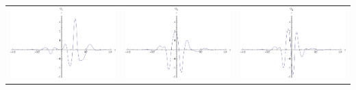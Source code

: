 \documentclass{article}
\begin{document}
\begin{landscape}
\begin{tabular}{ccc}
\includegraphics[width=6.7cm]{quadratic_wavelet_4.pdf}& \includegraphics[width=6.7cm]{quadratic_wavelet_5.pdf}& \includegraphics[width=6.7cm]{quadratic_wavelet_6.pdf} \\
\end{tabular} 
 \end{landscape}
\end{document}
